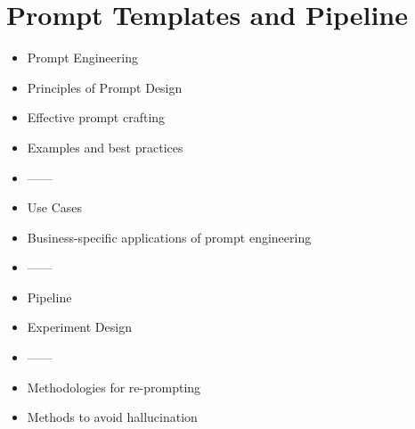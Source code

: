 \section{Prompt Templates and Pipeline}
\begin{itemize}
    \item Prompt Engineering
    \item Principles of Prompt Design
    \item Effective prompt crafting
    \item Examples and best practices
    \item ------
    \item Use Cases
    \item Business-specific applications of prompt engineering
    \item ------
    \item Pipeline
    \item Experiment Design
    \item ------
    \item Methodologies for re-prompting
    \item Methods to avoid hallucination
\end{itemize}
